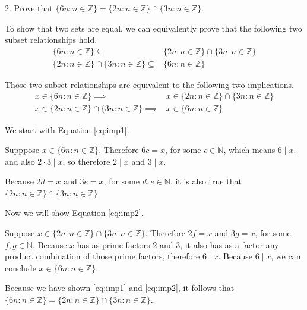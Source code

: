 \documentclass{idrisMemo}
\newcommand{\set}[1]{\{#1\}}
\begin{document}
\begin{prooflist}{2. Prove that $\set{6 n: n \in \mathbb{Z}}=\set{2 n: n \in
    \mathbb{Z}} \cap\set{3 n: n \in \mathbb{Z}}$.}
\item To show that two sets are equal, we can equivalently prove that the following two subset
    relationships hold.
\begin{align}
\{6n: n \in \mathbb{Z}\}
\subseteq&
\{2n: n \in \mathbb{Z}\} \cap \{3n: n \in \mathbb{Z}\} \label{eq:line1} \\
\{2n: n \in \mathbb{Z}\} \cap \{3n: n \in \mathbb{Z}\}
\subseteq&
\{6n: n \in \mathbb{Z}\} \label{eq:line2}
\end{align}
\item Those two subset relationships are equivalent to the following two
    implications.
\begin{align}
x \in \{6n: n \in \mathbb{Z}\}
\implies&
x \in \{2n: n \in \mathbb{Z}\} \cap \{3n: n \in \mathbb{Z}\} \label{eq:imp1} \\
x \in \{2n: n \in \mathbb{Z}\} \cap \{3n: n \in \mathbb{Z}\}
\implies&
x \in \{6n: n \in \mathbb{Z}\} \label{eq:imp2}
\end{align}

We start with Equation \ref{eq:imp1}.
\item Supppose $x \in \{6n: n \in \mathbb{Z}\}$. Therefore $6c = x$, for some
    $c\in\mathbb{N}$, which means $6\mid x.$ and also $2\cdot3\mid x$, so
    therefore $2\mid x$ and $3\mid x$.
\item Because $2d=x$ and $3e=x$, for some $d, e \in \mathbb{N}$,
    it is also true that $\{2n: n \in \mathbb{Z}\} \cap \{3n: n \in \mathbb{Z}\}$.

Now we will show Equation \ref{eq:imp2}.
\item Suppose $x \in \set{2n: n \in \mathbb{Z}} \cap \set{3n: n \in
    \mathbb{Z}}$. Therefore $2f=x$ and $3g=x$, for some $f, g \in \mathbb{N}$.
    Because $x$ has as prime factors $2$ and $3$, it also has as a factor any
    product combination of those prime factors, therefore $6\mid x$. Because
    $6\mid x$, we can conclude $x \in \{6n: n \in \mathbb{Z}\}$.
\item Because we have shown \ref{eq:imp1} and \ref{eq:imp2}, it follows that
$\set{6 n: n \in \mathbb{Z}}=\set{2 n: n \in \mathbb{Z}} \cap\set{3 n: n \in
\mathbb{Z}}$..
\end{prooflist}
\end{document}
